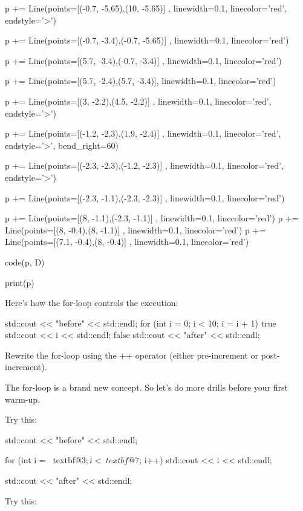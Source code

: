 \begin{python}
p += Line(points=[(-0.7, -5.65),(10, -5.65)] , linewidth=0.1, linecolor='red', endstyle='>')

p += Line(points=[(-0.7, -3.4),(-0.7, -5.65)] , linewidth=0.1, linecolor='red')

p += Line(points=[(5.7, -3.4),(-0.7, -3.4)] , linewidth=0.1, linecolor='red')

p += Line(points=[(5.7, -2.4),(5.7, -3.4)], linewidth=0.1, linecolor='red')

p += Line(points=[(3, -2.2),(4.5, -2.2)] , linewidth=0.1, linecolor='red', endstyle='>')

p += Line(points=[(-1.2, -2.3),(1.9, -2.4)] , linewidth=0.1, linecolor='red', endstyle='>', bend_right=60)

p += Line(points=[(-2.3, -2.3),(-1.2, -2.3)] , linewidth=0.1, linecolor='red', endstyle='>')

p += Line(points=[(-2.3, -1.1),(-2.3, -2.3)] , linewidth=0.1, linecolor='red')

p += Line(points=[(8, -1.1),(-2.3, -1.1)] , linewidth=0.1, linecolor='red')
p += Line(points=[(8, -0.4),(8, -1.1)] , linewidth=0.1, linecolor='red')
p += Line(points=[(7.1, -0.4),(8, -0.4)] , linewidth=0.1, linecolor='red')

code(p, D)

print(p)
\end{python}
Here's how the for-loop controls the execution:
\begin{console}
std::cout << "before" << std::endl;
for (int i = 0; i < 10; i = i + 1)
true
std::cout << i << std::endl;
false
std::cout << "after" << std::endl;
\end{console}

\begin{ex}
 Rewrite the for-loop using the ++ operator (either
pre-increment or post-increment).
\end{ex}

\newpage{}

The for-loop is a brand new concept. So let's do more
drills before your first warm-up.


Try this:
\begin{console}[commandchars=\~\@\$]
std::cout << "before" << std::endl;

for (int i = ~textbf@3$; i < ~textbf@7$; i++)
    std::cout << i << std::endl;

std::cout << "after" << std::endl;
\end{console}


Try this:


